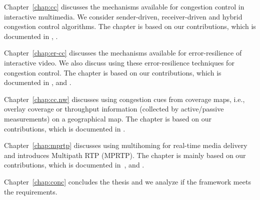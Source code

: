 
Chapter~\ref{chap:cc} discusses the mechanisms available for congestion
control in interactive multimedia. We consider sender-driven, receiver-driven
and hybrid congestion control algorithms. The chapter is based on our
contributions, which is documented in , .


Chapter~\ref{chap:er-cc} discusses the mechanisms available for
error-resilience of interactive video. We also discuss using these
error-resilience techniques for congestion control. The chapter is based on
our contributions, which is documented in , and
.



Chapter~\ref{chap:cc.nw} discusses using congestion cues from coverage maps,
i.e., overlay coverage or throughput information (collected by active/passive
measurements) on a geographical map. The chapter is based on our
contributions, which is documented in .


Chapter~\ref{chap:mprtp} discusses using multihoming for real-time media
delivery and introduces Multipath RTP (MPRTP). The chapter is mainly based on
our contributions, which is documented in~\cite{draft.mprtp, draft.mprtp.sdp,
Globisch:AsymGrpComm, draft.rtcp.overlay}, and .


Chapter~\ref{chap:conc} concludes the thesis and we analyze if the framework
meets the requirements.

